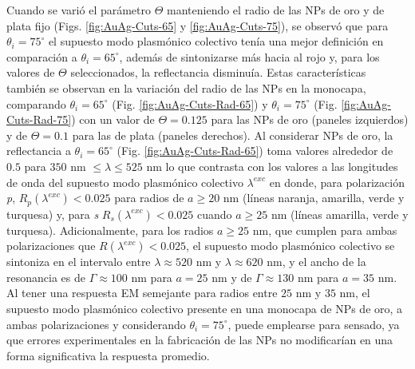 Cuando se varió el parámetro $\Theta$ manteniendo el radio de las NPs de oro y de plata fijo (Figs. \ref{fig:AuAg-Cuts-65} y \ref{fig:AuAg-Cuts-75}), se observó que para $\theta_i=75^\circ$  el supuesto modo plasmónico colectivo tenía una mejor definición en comparación a $\theta_i =65^\circ$, además de sintonizarse más hacia al rojo y, para los valores de $\Theta$ seleccionados, la reflectancia disminuía. Estas características también se observan en la variación del radio de las NPs en la monocapa, comparando $\theta_i=65^\circ$ (Fig. \ref{fig:AuAg-Cuts-Rad-65}) y $\theta_i=75^\circ$ (Fig. \ref{fig:AuAg-Cuts-Rad-75})  con un valor de $\Theta=0.125$ para las NPs de oro (paneles izquierdos) y de $\Theta=0.1$ para las de plata (paneles derechos). Al considerar NPs de oro, la reflectancia a $\theta_i= 65^\circ$ (Fig. \ref{fig:AuAg-Cuts-Rad-65})  toma valores alrededor de $0.5$ para $350$ nm $\leq \lambda\leq 525$ nm lo que contrasta con los valores a las longitudes de onda del supuesto modo plasmónico colectivo $\lambda^{exc}$ en donde, para polarización \emph{p}, $R_p(\lambda^{exc})<0.025$ para radios de $a\geq 20$ nm (líneas naranja, amarilla, verde y turquesa) y, para \emph{s} $R_s(\lambda^{exc})<0.025$ cuando $a\geq 25$ nm (líneas amarilla, verde y turquesa). Adicionalmente, para los radios  $a\geq 25$ nm, que cumplen para ambas polarizaciones que $R(\lambda^{exc})<0.025$, el supuesto modo plasmónico colectivo se sintoniza en el intervalo entre $\lambda\approx 520$ nm y $\lambda\approx 620$ nm, y el ancho de la resonancia es de $\Gamma \approx 100$ nm para $a=25$ nm y de $\Gamma\approx 130$ nm para $a=35$ nm. Al tener una respuesta EM semejante para radios entre $25$ nm y $35$ nm, el supuesto modo plasmónico colectivo presente en una monocapa de NPs de oro, a ambas polarizaciones y considerando $\theta_i=75^\circ$, puede emplearse para sensado, ya que errores experimentales en la fabricación de las NPs no modificarían en una forma significativa la respuesta promedio.


